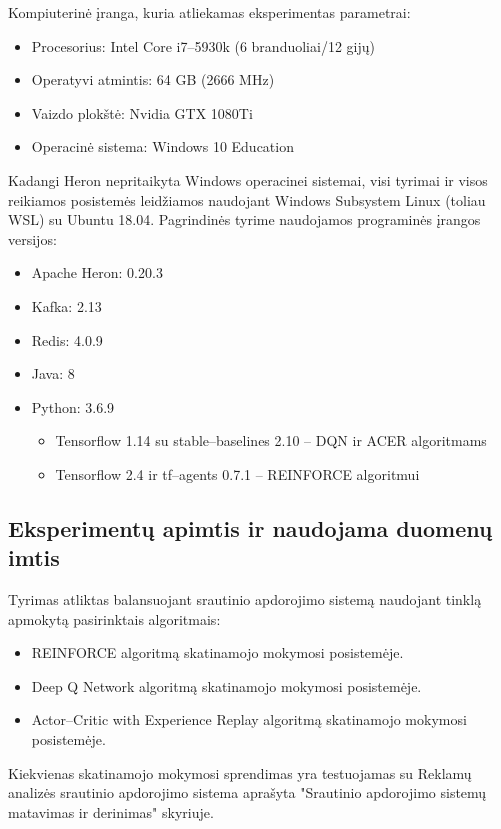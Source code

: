\documentclass{VUMIFPSbakalaurinis}
\begin{document}
Kompiuterinė įranga, kuria atliekamas eksperimentas parametrai:
\begin{itemize}
    \item Procesorius: Intel Core i7–5930k (6 branduoliai/12 gijų)
    \item Operatyvi atmintis: 64 GB (2666 MHz)
    \item Vaizdo plokštė: Nvidia GTX 1080Ti
    \item Operacinė sistema: Windows 10 Education
\end{itemize}

Kadangi Heron nepritaikyta Windows operacinei sistemai, visi tyrimai ir visos reikiamos posistemės leidžiamos naudojant Windows Subsystem Linux (toliau WSL) su Ubuntu 18.04.
Pagrindinės tyrime naudojamos programinės įrangos versijos:
\begin{itemize}
    \item Apache Heron: 0.20.3
    \item Kafka: 2.13
    \item Redis: 4.0.9
    \item Java: 8
    \item Python: 3.6.9
    \begin{itemize}
        \item Tensorflow 1.14 su stable–baselines 2.10 – DQN ir ACER algoritmams
        \item Tensorflow 2.4 ir tf–agents 0.7.1 – REINFORCE algoritmui
    \end{itemize}
\end{itemize}
\subsection{Eksperimentų apimtis ir naudojama duomenų imtis}

Tyrimas atliktas balansuojant srautinio apdorojimo sistemą naudojant tinklą apmokytą pasirinktais algoritmais:
\begin{itemize}
        \item REINFORCE algoritmą skatinamojo mokymosi posistemėje.
        \item Deep Q Network algoritmą skatinamojo mokymosi posistemėje.
        \item Actor–Critic with Experience Replay algoritmą skatinamojo mokymosi posistemėje.
\end{itemize}

Kiekvienas skatinamojo mokymosi sprendimas yra testuojamas su Reklamų analizės srautinio apdorojimo sistema aprašyta "Srautinio apdorojimo sistemų matavimas ir derinimas" skyriuje.
\end{document}
